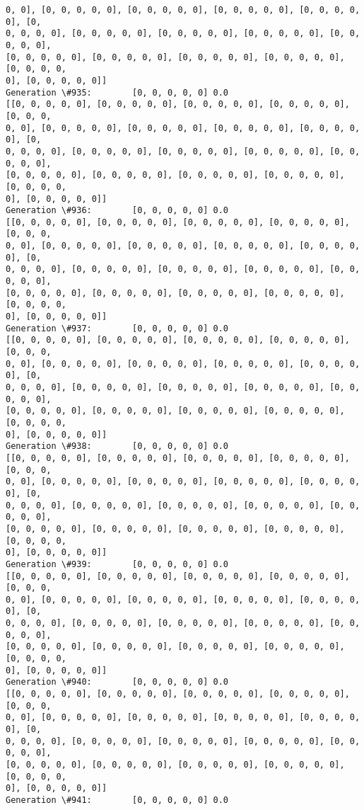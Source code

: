 \documentclass[11pt]{article}
\begin{document}
\begin{Verbatim}[commandchars=\\\{\}]
0, 0], [0, 0, 0, 0, 0], [0, 0, 0, 0, 0], [0, 0, 0, 0, 0], [0, 0, 0, 0, 0], [0,
0, 0, 0, 0], [0, 0, 0, 0, 0], [0, 0, 0, 0, 0], [0, 0, 0, 0, 0], [0, 0, 0, 0, 0],
[0, 0, 0, 0, 0], [0, 0, 0, 0, 0], [0, 0, 0, 0, 0], [0, 0, 0, 0, 0], [0, 0, 0, 0,
0], [0, 0, 0, 0, 0]]
Generation \#935:        [0, 0, 0, 0, 0] 0.0
[[0, 0, 0, 0, 0], [0, 0, 0, 0, 0], [0, 0, 0, 0, 0], [0, 0, 0, 0, 0], [0, 0, 0,
0, 0], [0, 0, 0, 0, 0], [0, 0, 0, 0, 0], [0, 0, 0, 0, 0], [0, 0, 0, 0, 0], [0,
0, 0, 0, 0], [0, 0, 0, 0, 0], [0, 0, 0, 0, 0], [0, 0, 0, 0, 0], [0, 0, 0, 0, 0],
[0, 0, 0, 0, 0], [0, 0, 0, 0, 0], [0, 0, 0, 0, 0], [0, 0, 0, 0, 0], [0, 0, 0, 0,
0], [0, 0, 0, 0, 0]]
Generation \#936:        [0, 0, 0, 0, 0] 0.0
[[0, 0, 0, 0, 0], [0, 0, 0, 0, 0], [0, 0, 0, 0, 0], [0, 0, 0, 0, 0], [0, 0, 0,
0, 0], [0, 0, 0, 0, 0], [0, 0, 0, 0, 0], [0, 0, 0, 0, 0], [0, 0, 0, 0, 0], [0,
0, 0, 0, 0], [0, 0, 0, 0, 0], [0, 0, 0, 0, 0], [0, 0, 0, 0, 0], [0, 0, 0, 0, 0],
[0, 0, 0, 0, 0], [0, 0, 0, 0, 0], [0, 0, 0, 0, 0], [0, 0, 0, 0, 0], [0, 0, 0, 0,
0], [0, 0, 0, 0, 0]]
Generation \#937:        [0, 0, 0, 0, 0] 0.0
[[0, 0, 0, 0, 0], [0, 0, 0, 0, 0], [0, 0, 0, 0, 0], [0, 0, 0, 0, 0], [0, 0, 0,
0, 0], [0, 0, 0, 0, 0], [0, 0, 0, 0, 0], [0, 0, 0, 0, 0], [0, 0, 0, 0, 0], [0,
0, 0, 0, 0], [0, 0, 0, 0, 0], [0, 0, 0, 0, 0], [0, 0, 0, 0, 0], [0, 0, 0, 0, 0],
[0, 0, 0, 0, 0], [0, 0, 0, 0, 0], [0, 0, 0, 0, 0], [0, 0, 0, 0, 0], [0, 0, 0, 0,
0], [0, 0, 0, 0, 0]]
Generation \#938:        [0, 0, 0, 0, 0] 0.0
[[0, 0, 0, 0, 0], [0, 0, 0, 0, 0], [0, 0, 0, 0, 0], [0, 0, 0, 0, 0], [0, 0, 0,
0, 0], [0, 0, 0, 0, 0], [0, 0, 0, 0, 0], [0, 0, 0, 0, 0], [0, 0, 0, 0, 0], [0,
0, 0, 0, 0], [0, 0, 0, 0, 0], [0, 0, 0, 0, 0], [0, 0, 0, 0, 0], [0, 0, 0, 0, 0],
[0, 0, 0, 0, 0], [0, 0, 0, 0, 0], [0, 0, 0, 0, 0], [0, 0, 0, 0, 0], [0, 0, 0, 0,
0], [0, 0, 0, 0, 0]]
Generation \#939:        [0, 0, 0, 0, 0] 0.0
[[0, 0, 0, 0, 0], [0, 0, 0, 0, 0], [0, 0, 0, 0, 0], [0, 0, 0, 0, 0], [0, 0, 0,
0, 0], [0, 0, 0, 0, 0], [0, 0, 0, 0, 0], [0, 0, 0, 0, 0], [0, 0, 0, 0, 0], [0,
0, 0, 0, 0], [0, 0, 0, 0, 0], [0, 0, 0, 0, 0], [0, 0, 0, 0, 0], [0, 0, 0, 0, 0],
[0, 0, 0, 0, 0], [0, 0, 0, 0, 0], [0, 0, 0, 0, 0], [0, 0, 0, 0, 0], [0, 0, 0, 0,
0], [0, 0, 0, 0, 0]]
Generation \#940:        [0, 0, 0, 0, 0] 0.0
[[0, 0, 0, 0, 0], [0, 0, 0, 0, 0], [0, 0, 0, 0, 0], [0, 0, 0, 0, 0], [0, 0, 0,
0, 0], [0, 0, 0, 0, 0], [0, 0, 0, 0, 0], [0, 0, 0, 0, 0], [0, 0, 0, 0, 0], [0,
0, 0, 0, 0], [0, 0, 0, 0, 0], [0, 0, 0, 0, 0], [0, 0, 0, 0, 0], [0, 0, 0, 0, 0],
[0, 0, 0, 0, 0], [0, 0, 0, 0, 0], [0, 0, 0, 0, 0], [0, 0, 0, 0, 0], [0, 0, 0, 0,
0], [0, 0, 0, 0, 0]]
Generation \#941:        [0, 0, 0, 0, 0] 0.0

\end{Verbatim}
\end{document}
